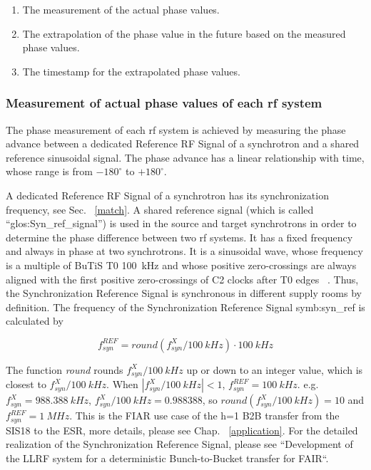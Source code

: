 \begin{enumerate}
\item The measurement of the actual phase values.
\item The extrapolation of the phase value in the future based on the measured phase values.
\item The timestamp for the extrapolated phase values.
\end{enumerate}
 \subsubsection{Measurement of actual phase values of each rf system}
The phase measurement of each rf system is achieved by measuring the phase advance between a dedicated Reference RF Signal of a synchrotron and a shared reference sinusoidal signal. The phase advance has a linear relationship with time, whose range is from $-180^\circ$ to $+180^\circ$. 


A dedicated Reference RF Signal of a synchrotron has its synchronization frequency, see Sec. ~\ref{match}. A shared reference signal (which is called “\gls{glos:Syn_ref_signal}”) is used in the source and target synchrotrons in order to determine the phase difference between two rf systems. It has a fixed frequency and always in phase at two synchrotrons. It is a sinusoidal wave, whose frequency is a multiple of BuTiS T0 \SI{100}{kHz} and whose positive zero-crossings are always aligned with the first positive zero-crossings of C2 clocks after T0 edges ~\cite{ferrand_system_2014, ferrand_system_2015}. Thus, the Synchronization Reference Signal is synchronous in different supply rooms by definition. The frequency of the Synchronization Reference Signal \gls{symb:syn_ref} is calculated by 

\begin{equation}
\label{round}
	f_\mathit{syn}^\mathit{REF}=\textit{round} (f_\mathit{syn}^{X}/\SI{100}{kHz})\cdot \SI{100}{kHz}
\end{equation}

The function \textit{round} rounds $f_\mathit{syn}^{X}/\SI{100}{kHz}$ up or down to an integer value, which is closest to $f_\mathit{syn}^{X}/\SI{100}{kHz}$. When $|f_\mathit{syn}^{X}/\SI{100}{kHz}|<1$, $f_\mathit{syn}^\mathit{REF}=\SI{100}{kHz}$. e.g. $f_\mathit{syn}^{X}=\SI{988.388}{kHz}$, $f_\mathit{syn}^{X}/\SI{100}{kHz}=0.988388$, so $\textit{round} (f_\mathit{syn}^{X}/\SI{100}{kHz})=10$ and $f_\mathit{syn}^\mathit{REF}=\SI{1}{MHz}$. This is the FIAR use case of the h=1 B2B transfer from the SIS18 to the ESR, more details, please see Chap. ~\ref{application}. For the detailed realization of the Synchronization Reference Signal, please see ``Development of the LLRF system for a deterministic Bunch-to-Bucket transfer for FAIR``.

